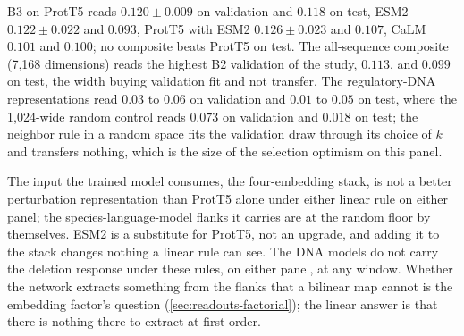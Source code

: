  B3 on ProtT5 reads $0.120 \pm
0.009$ on validation and $0.118$ on test, ESM2 $0.122 \pm 0.022$ and $0.093$, ProtT5 with
ESM2 $0.126 \pm 0.023$ and $0.107$, CaLM $0.101$ and $0.100$; no composite beats ProtT5 on
test. The all-sequence composite (7{,}168 dimensions) reads the highest B2 validation of
the study, $0.113$, and $0.099$ on test, the width buying validation fit and not transfer.
The regulatory-DNA representations read $0.03$ to $0.06$ on validation and $0.01$ to
$0.05$ on test, where the 1{,}024-wide random control reads $0.073$ on validation and
$0.018$ on test; the neighbor rule in a random space fits the validation draw through its
choice of $k$ and transfers nothing, which is the size of the selection optimism on this
panel.

 The input the trained model consumes, the
four-embedding stack, is not a better perturbation representation than ProtT5 alone under
either linear rule on either panel; the species-language-model flanks it carries are at
the random floor by themselves. ESM2 is a substitute for ProtT5, not an upgrade, and
adding it to the stack changes nothing a linear rule can see. The DNA models do not carry
the deletion response under these rules, on either panel, at any window. Whether the
network extracts something from the flanks that a bilinear map cannot is the embedding
factor's question (\cref{sec:readouts-factorial}); the linear answer is that there is nothing there to
extract at first order.
